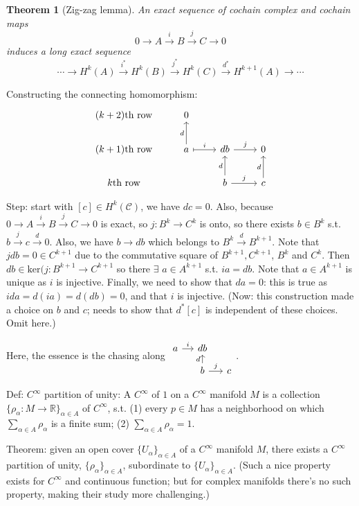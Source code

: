 \documentclass{article}
\theoremstyle{mystyle}
\newtheorem*{theorem*}{Theorem}
\theoremstyle{remark}
\numberwithin{equation}{section}
\begin{document}
\begin{theorem*}[Zig-zag lemma] An exact sequence of cochain complex and cochain maps 
$$0\rightarrow A\xrightarrow{i}B\xrightarrow{j} C\rightarrow 0$$
induces a long exact sequence
$$\cdots \rightarrow H^k(A)\xrightarrow{i^*}H^k(B)\xrightarrow{j^*}H^k(C)\xrightarrow{d^*}
H^{k+1}(A)\rightarrow \cdots$$
\end{theorem*}

Constructing the connecting homomorphism:
$$
\begin{tikzcd}
(k+2)\text{th row}   & 0&&\\
(k+1)\text{th row}   & a\rar[mapsto,"i"]\ar[u,"d"] &db\ar[r,"j"]&0\\
k\text{th row}& &b\ar[r,"j"]\ar[u,"d"]& c\ar[u,"d"]
\end{tikzcd}
$$ 

Step: start with $[c]\in H^k(\mathcal{C})$, we have $dc=0$. Also, because $0\rightarrow A\xrightarrow{i} B\xrightarrow{j}C\rightarrow 0$ is exact, so $j\colon B^k\rightarrow C^k$ is onto, so there exists $b\in B^k$ s.t. $b\xrightarrow{j} c \xrightarrow{d}0$. Also, we have $b\rightarrow db$ which belongs to $B^k\xrightarrow{d} B^{k+1}$. Note that $jdb=0 \in C^{k+1}$ due to the commutative square of $B^{k+1},C^{k+1}$, $B^k$ and $C^k$. Then $db \in \mathrm{ker}(j\colon B^{k+1}\rightarrow C^{k+1}$ so there $\exists$ $a \in A^{k+1}$ s.t. $ia = db$. Note that $a \in A^{k+1}$ is unique as $i$ is injective. Finally, we need to show that $da = 0$: this is true as $ida = d(ia) = d(db) = 0$, and that $i$ is injective. (Now: this construction made a choice on $b$ and $c$; needs to show that $d^*[c]$ is independent of these choices. Omit here.)

Here, the essence is the chasing along $\begin{tikzcd}[column sep = small, row sep = small]a \ar[r,"i"]&db&\\&b\ar[r,"j"]\ar[u,"d"]&c\end{tikzcd}$. 

Def: $C^\infty$ partition of unity: A $C^\infty$ of $1$ on a $C^\infty$ manifold $M$ is a collection $\{\rho_\alpha\colon M\rightarrow \mathbb{R}\}_{\alpha \in A}$ of $C^\infty$, s.t. (1) every $p\in M$ has a neighborhood on which $\sum_{\alpha \in A}\rho_\alpha$ is a finite sum; (2) $\sum_{\alpha \in A}\rho_\alpha = 1$. 

Theorem: given an open cover $\{U_\alpha\}_{\alpha \in A}$ of a $C^\infty$ manifold $M$, there exists a $C^\infty$ partition of unity, $\{\rho_\alpha\}_{\alpha \in A}$, subordinate to $\{U_\alpha\}_{\alpha \in A}$. (Such a nice property exists for $C^\infty$ and continuous function; but for complex manifolds there's no such property, making their study more challenging.)
\end{document}
